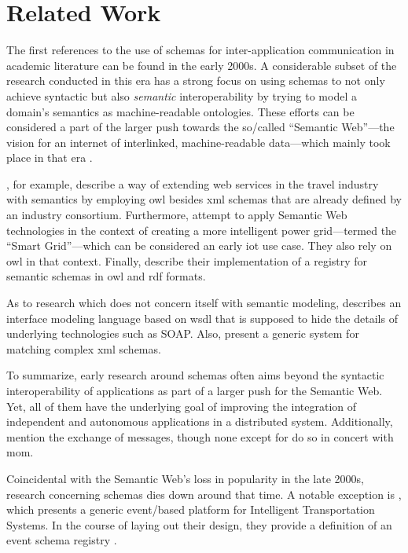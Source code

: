 
\section{Related Work}\label{sec:related-work}

The first references to the use of schemas for inter-application communication in academic literature can be found in the early 2000s.
A considerable subset of the research conducted in this era has a strong focus on using schemas to not only achieve syntactic but also \emph{semantic} interoperability by trying to model a domain's semantics as machine-readable ontologies.
These efforts can be considered a part of the larger push towards the so\-/called \enquote{Semantic Web}---the vision for an internet of interlinked, machine-readable data---which mainly took place in that era \parencite{noauthor_semantic_nodate}.

\cite{dogac_semantically_2004}, for example, describe a way of extending web services in the travel industry with semantics by employing \gls{owl} besides \gls{xml} schemas that are already defined by an industry consortium.
Furthermore, \cite{crapo_semantically_2009} attempt to apply Semantic Web technologies in the context of creating a more intelligent power grid---termed the \enquote{Smart Grid}---which can be considered an early \gls{iot} use case. They also rely on \gls{owl} in that context.
Finally, \cite{heery_metadata_2003} describe their implementation of a registry for semantic schemas in \gls{owl} and \gls{rdf} formats.

As to research which does not concern itself with semantic modeling, \cite{duftler_web_2001} describes an interface modeling language based on \gls{wsdl} that is supposed to hide the details of underlying technologies such as SOAP.
Also, \cite{do_matching_2007} present a generic system for matching complex \gls{xml} schemas.

To summarize, early research around schemas often aims beyond the syntactic interoperability of applications as part of a larger push for the Semantic Web.
Yet, all of them have the underlying goal of improving the integration of independent and autonomous applications in a distributed system.
Additionally, \cites{duftler_web_2001}{dogac_semantically_2004}{li_semantic_2004}{crapo_semantically_2009} mention the exchange of messages, though none except for \cite{li_semantic_2004} do so in concert with \gls{mom}.

Coincidental with the Semantic Web's loss in popularity in the late 2000s, research concerning schemas dies down around that time.
A notable exception is \cite{ma_iip_2010}, which presents a generic event\-/based platform for Intelligent Transportation Systems.
In the course of laying out their design, they provide a definition of an event schema registry \parencite[see][p.~3]{ma_iip_2010}.

